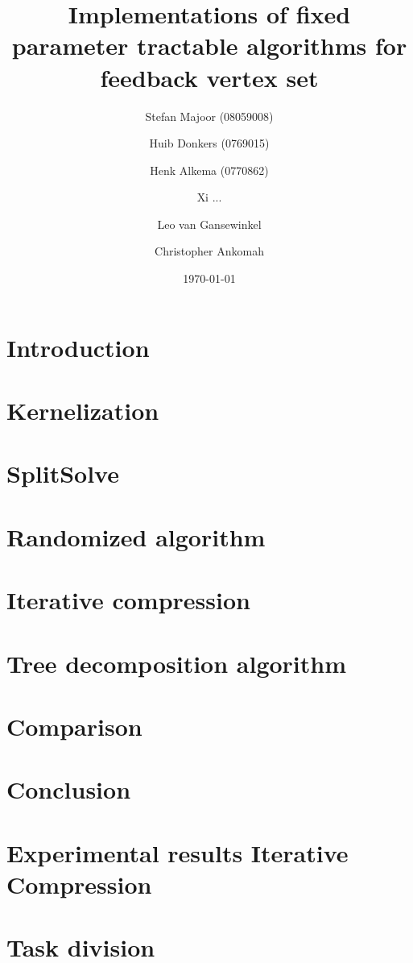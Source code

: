 \documentclass[a4paper,10pt]{article}
\title{Implementations of fixed parameter tractable algorithms for feedback vertex set}
\author{
	Stefan Majoor (08059008)
	\and
	Huib Donkers (0769015)
	\and
	Henk Alkema (0770862)
	\and
	Xi ...
	\and
	Leo van Gansewinkel
	\and
	Christopher Ankomah
}
\date{\today}
\begin{document}
\maketitle
\setcounter{tocdepth}{2}
\tableofcontents
\clearpage

\begin{abstract}

\end{abstract}

\section{Introduction} \label{sec:intro}


\section{Kernelization} \label{sec:kern}


\section{SplitSolve} \label{sec:splitsolve}


\section{Randomized algorithm} \label{sec:rand}


\section{Iterative compression} \label{sec:itcomp}


\section{Tree decomposition algorithm} \label{sec:treewidth}


\section{Comparison} \label{sec:comparison}


\section{Conclusion} \label{sec:conclusion}

\clearpage
\appendix
\section{Experimental results Iterative Compression} \label{app:itcomp}


\section{Task division}

\end{document}
